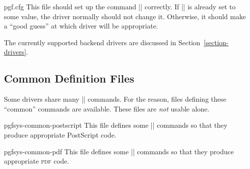 \begin{filedescription}{pgf.cfg}
    This file should set up the command |\pgfsysdriver| correctly. If
    |\pgfsysdriver| is already set to some value, the driver normally should
    not change it. Otherwise, it should make a ``good guess'' at which driver
    will be appropriate.
\end{filedescription}

The currently supported backend drivers are discussed in
Section~\ref{section-drivers}.


\subsection{Common Definition Files}

Some drivers share many |\pgfsys@| commands. For the reason, files defining
these ``common'' commands are available. These files are \emph{not} usable
alone.

\begin{filedescription}{pgfsys-common-postscript}
    This file defines some |\pgfsys@| commands so that they produce appropriate
    PostScript code.
\end{filedescription}

\begin{filedescription}{pgfsys-common-pdf}
    This file defines some |\pgfsys@| commands so that they produce appropriate
    \textsc{pdf} code.
\end{filedescription}



